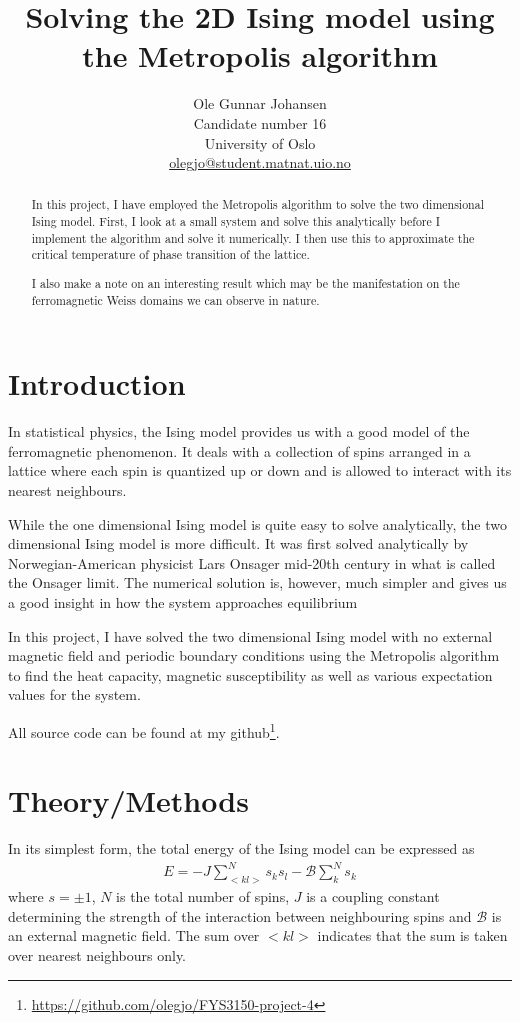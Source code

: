 \documentclass[twoside, 11pt]{article}
\title{\vspace{-15mm}\fontsize{16pt}{13pt}\selectfont\textbf{Solving the 2D Ising model using the Metropolis algorithm}} %
\author{
\large
Ole Gunnar Johansen\\[0mm]%
Candidate number 16 \\
\normalsize University of Oslo \\[0mm] %
\normalsize \href{mailto:olegjo@ulrik.uio.no}{olegjo@student.matnat.uio.no} %
\vspace{5mm}
}
\date{}
\begin{document}
\maketitle %
\thispagestyle{fancy} %


\begin{abstract}

\noindent
In this project, I have employed the Metropolis algorithm to solve the two dimensional Ising model. First, I look at a small system and solve this analytically before I implement the algorithm and solve it numerically. I then use this to approximate the critical temperature of phase transition of the lattice.

I also make a note on an interesting result which may be the manifestation on the ferromagnetic Weiss domains we can observe in nature. 

\end{abstract}


\section{Introduction}
	In statistical physics, the Ising model provides us with a good model of the ferromagnetic phenomenon. It deals with a collection of spins arranged in a lattice where each spin is quantized up or down and is allowed to interact with its nearest neighbours. 

	While the one dimensional Ising model is quite easy to solve analytically, the two dimensional Ising model is more difficult. It was first solved analytically by Norwegian-American physicist Lars Onsager mid-20th century in what is called the Onsager limit. The numerical solution is, however, much simpler and gives us a good insight in how the system approaches equilibrium
	
	In this project, I have solved the two dimensional Ising model with no external magnetic field and periodic boundary conditions using the Metropolis algorithm to find the heat capacity, magnetic susceptibility as well as various expectation values for the system.
	

	
	All source code can be found at my github\footnote{\url{https://github.com/olegjo/FYS3150-project-4}}.

\section{Theory/Methods}
	In its simplest form, the total energy of the Ising model can be expressed as
	\begin{align}
		E = -J \sum_{<kl>}^N s_ks_l - \mathcal{B}\sum_k^N s_k
	\end{align}
	where $s = \pm 1$, $N$ is the total number of spins, $J$ is a coupling constant determining the strength of the interaction between neighbouring spins and $\mathcal{B}$ is an external magnetic field. The sum over $<kl>$ indicates that the sum is taken over nearest neighbours only. 
	
\end{document}
